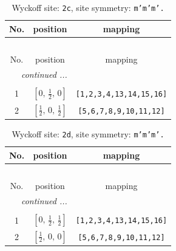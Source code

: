\documentclass[fleqn,8pt]{jsarticle}
\begin{document}
\renewcommand{\arraystretch}{1.2}
\begin{longtable}{ccc}
\caption{Wyckoff site: {\tt 2c}, site symmetry: {\tt m'm'm'.}}
 \\
 \hline \hline
No. & position & mapping \\ \hline \endfirsthead

\multicolumn{2}{l}{\tablename\ \thetable{}} \\
 \hline \hline
No. & position & mapping \\ \hline \endhead

 \hline \hline
\multicolumn{2}{r}{\footnotesize\it continued ...} \\ \endfoot

 \hline \hline
\multicolumn{2}{r}{} \\ \endlastfoot

1 & $\left[ 0,\, \frac{1}{2},\, 0 \right]$ & {\tt [1,2,3,4,13,14,15,16]} \\ \hline
2 & $\left[ \frac{1}{2},\, 0,\, \frac{1}{2} \right]$ & {\tt [5,6,7,8,9,10,11,12]} \\
\end{longtable}
\renewcommand{\arraystretch}{1.2}
\begin{longtable}{ccc}
\caption{Wyckoff site: {\tt 2d}, site symmetry: {\tt m'm'm'.}}
 \\
 \hline \hline
No. & position & mapping \\ \hline \endfirsthead

\multicolumn{2}{l}{\tablename\ \thetable{}} \\
 \hline \hline
No. & position & mapping \\ \hline \endhead

 \hline \hline
\multicolumn{2}{r}{\footnotesize\it continued ...} \\ \endfoot

 \hline \hline
\multicolumn{2}{r}{} \\ \endlastfoot

1 & $\left[ 0,\, \frac{1}{2},\, \frac{1}{2} \right]$ & {\tt [1,2,3,4,13,14,15,16]} \\ \hline
2 & $\left[ \frac{1}{2},\, 0,\, 0 \right]$ & {\tt [5,6,7,8,9,10,11,12]} \\
\end{longtable}
\renewcommand{\arraystretch}{1.2}
\end{document}

